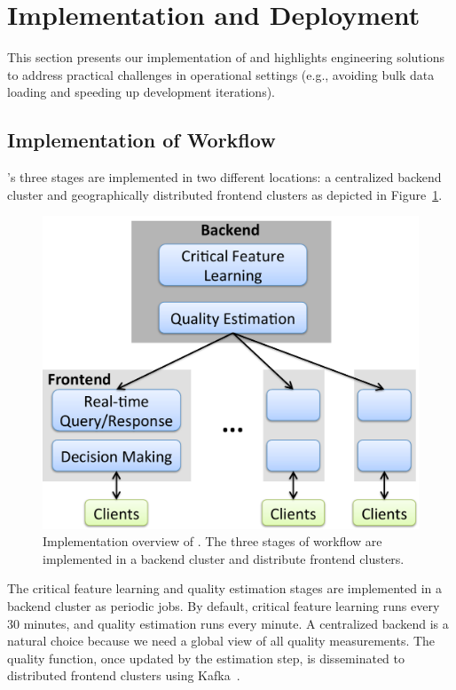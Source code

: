 \section{Implementation and Deployment}
\label{sec:cfa:impl}

This section presents our implementation of \dda 
 and highlights engineering solutions to address practical challenges 
 in operational settings (e.g., avoiding bulk data loading and 
speeding up development iterations).

\subsection{Implementation of \dda Workflow}
\label{subsec:cfa:impl:workflow}

\dda's three stages are implemented in two different locations:
a centralized backend cluster and geographically 
distributed frontend clusters as depicted in Figure~\ref{fig:impl}. 


\begin{figure}[t!]
\centering
\includegraphics[width=.5\textwidth]{figures/cfa-impl-overview.pdf}
\vspace{-0.1cm}
\caption{Implementation overview of \dda. The three stages of 
\dda workflow are implemented in a backend cluster and distribute
frontend clusters.}
\label{fig:impl}
\end{figure}

The critical feature learning and quality 
estimation stages are implemented in a backend 
cluster as periodic jobs. 
By default, critical feature learning runs every 30 
minutes, and quality estimation runs every minute. 
A centralized backend is a natural choice because 
we need  a global view of all quality measurements.
The quality function, once updated by the estimation 
step, is disseminated to distributed 
frontend clusters using Kafka~\cite{kreps2011kafka}.

